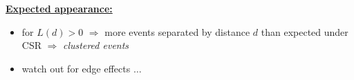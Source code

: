\documentclass[portrait]{seminar}
\begin{document}
%
%
\begin{slide*}
\begin{center}
 \vspace*{-0.5cm} 
\end{center}

\vspace{0.1cm}
\begin{center}
\begin{figure}
 \hspace{0.5cm}
\end{figure}
\end{center}

\vspace{-0.9cm}
\begin{center}
\hspace{-0.6cm}
\begin{figure}
 \hspace{0.3cm}
\end{figure}
\end{center}

\vspace{0.0cm} \underline{\textbf{Expected appearance:}}
\begin{itemize}
\item for $\hat{L}(d) > 0$ $\Rightarrow$ more events
separated by distance $d$ than expected under CSR $\Rightarrow$ {\em
clustered events}
\item watch out for edge effects $\ldots$
\end{itemize}


\end{slide*}
\end{document}
